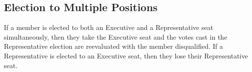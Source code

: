 \subsection{Election to Multiple Positions}
If a member is elected to both an Executive and a Representative seat
simultaneously, then they take the Executive seat and the votes cast in the
Representative election are reevaluated with the member disqualified. If a
Representative is elected to an Executive seat, then they lose their
Representative seat.
